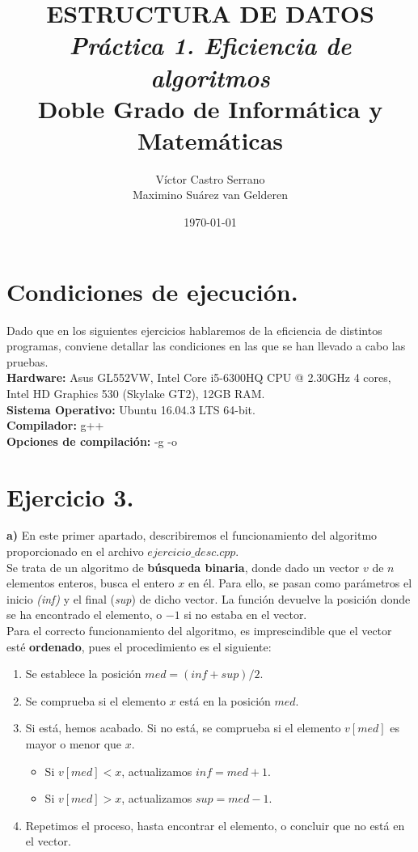 \documentclass[11pt,a4paper]{article}
\title{\textbf{ESTRUCTURA DE DATOS}\\
	   \textit{Práctica 1. Eficiencia de algoritmos}\\
	   \large \vspace{0.25em} Doble Grado de Informática y Matemáticas}
\author{Víctor Castro Serrano\\ Maximino Suárez van Gelderen}
\date{\today}
\begin{document}
\maketitle

\section*{Condiciones de ejecución.}

Dado que en los siguientes ejercicios hablaremos de la eficiencia de distintos programas, conviene detallar las condiciones en las que se han llevado a cabo las pruebas. \\

\textbf{Hardware:} Asus GL552VW, Intel Core i5-6300HQ CPU @ 2.30GHz 4 cores, Intel HD Graphics 530 (Skylake GT2), 12GB RAM. \\
\textbf{Sistema Operativo:} Ubuntu 16.04.3 LTS 64-bit. \\
\textbf{Compilador:} g++ \\
\textbf{Opciones de compilación:} -g -o


\section*{Ejercicio 3.}

\textbf{a)} En este primer apartado, describiremos el funcionamiento del algoritmo proporcionado en el archivo $ejercicio\_desc.cpp$.\\

Se trata de un algoritmo de \textbf{búsqueda binaria}, donde dado un vector $v$ de $n$ elementos enteros, busca el entero $x$ en él. Para ello, se pasan como parámetros el inicio \textit{(inf)} y el final (\textit{sup}) de dicho vector. La función devuelve la posición donde se ha encontrado el elemento, o $-1$ si no estaba en el vector.\\

Para el correcto funcionamiento del algoritmo, es imprescindible que el vector esté \textbf{ordenado}, pues el procedimiento es el siguiente:

\begin{enumerate}
\item Se establece la posición $med = (inf+sup)/2$.
\item Se comprueba si el elemento $x$ está en la posición $med$.
\item Si está, hemos acabado. Si no está, se comprueba si el elemento $v[med]$ es mayor o menor que $x$.
    \begin{itemize}
    \item Si $v[med] < x$, actualizamos $inf = med + 1$.
    \item Si $v[med] > x$, actualizamos $sup = med - 1$.
    \end{itemize}
\item Repetimos el proceso, hasta encontrar el elemento, o concluir que no está en el vector.
\end{enumerate}
\end{document}
